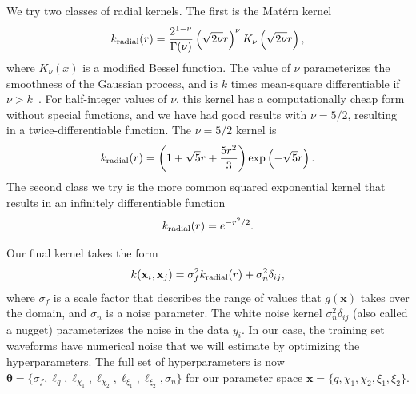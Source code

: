 \documentclass[prd,aps,letter,twocolumn,floatfix,notitlepage,nofootinbib]{revtex4-1}
\def\bx{\mathbf{x}}
\def\btheta{\boldsymbol{\theta}}
\begin{document}
We try two classes of radial kernels. The first is the Mat\'{e}rn kernel
\begin{equation}
k_{\rm radial}(r) = \frac{2^{1-\nu}}{\Gamma(\nu)} \left(\sqrt{2\nu} r\right)^\nu K_\nu \left(\sqrt{2\nu} r \right),
\end{equation}
where $K_\nu(x)$ is a modified Bessel function. The value of $\nu$ parameterizes the smoothness of the Gaussian process, and is $k$ times mean-square differentiable if $\nu>k$~\cite{RasmussenWilliams2006}. For half-integer values of $\nu$, this kernel has a computationally cheap form without special functions, and we have had good results with $\nu=5/2$, resulting in a twice-differentiable function. The $\nu=5/2$ kernel is
\begin{equation}
k_{\rm radial}(r) = \left(1+\sqrt{5}r + \frac{5r^2}{3}\right) \exp\left(-\sqrt{5}r\right).
\end{equation}
The second class we try is the more common squared exponential kernel that results in an infinitely differentiable function~\cite{RasmussenWilliams2006}
\begin{equation}
k_{\rm radial}(r) = e^{-r^2/2}.
\end{equation}

Our final kernel takes the form
\begin{equation}
k(\bx_i, \bx_j) = \sigma_f^2 k_{\rm radial}(r) + \sigma_n^2 \delta_{ij},
\end{equation}
where $\sigma_f$ is a scale factor that describes the range of values that $g(\bx)$ takes over the domain, and $\sigma_n$ is a noise parameter. The white noise kernel $\sigma_n^2 \delta_{ij}$ (also called a nugget) parameterizes the noise in the data $y_i$. In our case, the training set waveforms have numerical noise that we will estimate by optimizing the hyperparameters. The full set of hyperparameters is now  $\btheta = \{\sigma_f, \ell_q, \ell_{\chi_1}, \ell_{\chi_2}, \ell_{\xi_1}, \ell_{\xi_2}, \sigma_n\}$ for our parameter space $\bx = \{q, \chi_1, \chi_2, \xi_1, \xi_2\}$.
\end{document}
